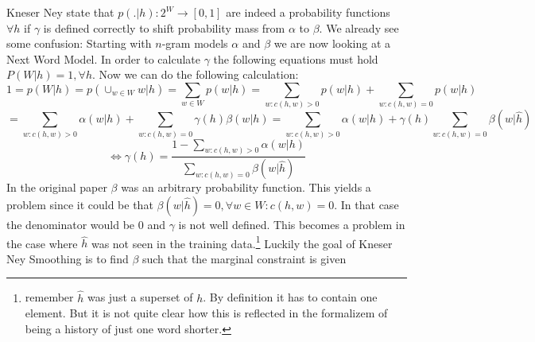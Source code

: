 \documentclass[•]{book}
\begin{document}
\begin{appendix}
Kneser Ney state that $p(.|h):2^W\rightarrow [0,1]$ are indeed a probability functions $\forall h$ if $\gamma$ is defined correctly to shift probability mass from $\alpha$ to $\beta$. 
We already see some confusion: Starting with $n$-gram models $\alpha$ and $\beta$ we are now looking at a Next Word Model. 
In order to calculate $\gamma$ the following equations must hold $P(W|h)=1, \forall h$.
Now we can do the following calculation:
\[
1=p(W|h)=p(\cup_{w\in W}w|h)=\sum_{w\in W}p(w|h)=
\sum_{w:c(h,w)>0}p(w|h)+\sum_{w:c(h,w)=0}p(w|h)
\]
\[
=\sum_{w:c(h,w)>0}\alpha(w|h)+\sum_{w:c(h,w)=0}\gamma(h)\beta(w|h) = \sum_{w:c(h,w)>0}\alpha(w|h)+\gamma(h)\sum_{w:c(h,w)=0}\beta(w|\hat h)
\] 
\[
\iff \gamma(h)=\frac{1-\sum_{w:c(h,w)>0}\alpha(w|h)}{\sum_{w:c(h,w)=0}\beta(w|\hat h)}
\]
In the original paper $\beta$ was an arbitrary probability function. 
This yields a problem since it could be that $\beta(w|\hat h)=0, \forall w\in W : c(h,w)=0$.
In that case the denominator would be $0$ and $\gamma$ is not well defined. 
This becomes a problem in the case where $\hat h$ was not seen in the training data.\footnote{remember $\hat h$ was just a superset of $h$. By definition it has to contain one element. But it is not quite clear how this is reflected in the formalizem of being a history of just one word shorter.}
Luckily the goal of Kneser Ney Smoothing is to find $\beta$ such that the marginal constraint is given 


\end{appendix}
\end{document}
